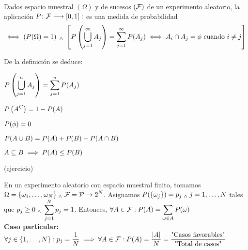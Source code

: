 \begin{defn} 
    Dados espacio muestral $(\Omega)$ y de sucesos $(\mathcal{F})$ de un experimento aleatorio, la aplicación $P \colon \mathcal{F} \longrightarrow [0, 1] : $ es una medida de probabilidad
    \[ \iff \left(P(\Omega) = 1\right) \; _{\wedge} \; \left[P\left(\bigcup_{j=1}^{\infty} A_j\right) = \sum_{j=1}^{\infty} P(A_j) \iff A_i\cap A_j = \phi \text{ cuando } i \ne j\right] \]
\end{defn}
\begin{prop}
    De la definición se deduce: \\
    \begin{enumerate*}[itemjoin=\hspace{1cm}]
        \item $\displaystyle P\left(\bigcup_{j=1}^n A_j\right) = \sum_{j=1}^{n} P(A_j)$
        \item $\displaystyle P\left(A^C\right) = 1-P(A)$
        \item $\displaystyle P(\phi) = 0$ \\
        \item $\displaystyle P(A\cup B) = P(A) + P(B) - P(A\cap B)$
        \item $\displaystyle A \subseteq B \implies P(A) \leq P(B)$
    \end{enumerate*}
\end{prop}
\begin{dem}
    (ejercicio)
\end{dem}
\begin{ejem}
    En un experimento aleatorio con espacio muestral finito, tomamos \\
    $\displaystyle \Omega = \{\omega_1, \dots, \omega_N\}  \; _{\wedge} \; \mathcal{F} = \mathcal{P} \rightarrow 2^N$. Asignamos $\displaystyle P(\{\omega_j\}) = p_j \; _{\wedge} \; j = 1, \dots, N$ tales que $\displaystyle p_j\geq 0 \; _{\wedge} \; \sum_{j=1}^{N} p_j = 1$. Entonces, $\displaystyle\forall A \in \mathcal{F} : P(A) = \sum_{\omega \in A} P(\omega)$ \\
    \textbf{Caso particular: }$\displaystyle \forall j \in \{1,\dots, N\} : p_j = \frac{1}{N} \implies \forall A \in \mathcal{F} : P(A) = \frac{|A|}{N} = \frac{\text{"Casos favorables"}}{\text{"Total de casos"}}$    
\end{ejem}

